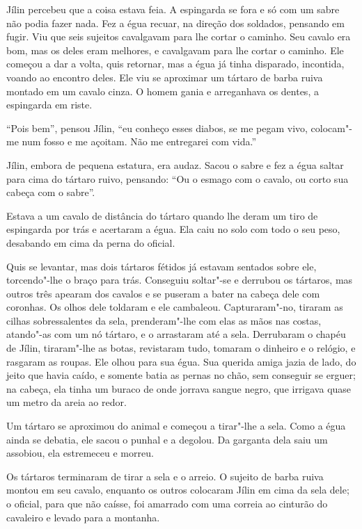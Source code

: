 Jílin percebeu que a coisa estava feia. A espingarda se fora e só com um
sabre não podia fazer nada. Fez a égua recuar, na direção dos soldados,
pensando em fugir. Viu que seis sujeitos cavalgavam para lhe cortar o
caminho. Seu cavalo era bom, mas os deles eram melhores, e cavalgavam
para lhe cortar o caminho. Ele começou a dar a volta, quis retornar, mas
a égua já tinha disparado, incontida, voando ao encontro deles. Ele viu
se aproximar um tártaro de barba ruiva montado em um cavalo cinza. O
homem gania e arreganhava os dentes, a espingarda em riste.

``Pois bem'', pensou Jílin, ``eu conheço esses diabos, se me pegam vivo,
colocam"-me num fosso e me açoitam. Não me entregarei com vida.''

Jílin, embora de pequena estatura, era audaz. Sacou o sabre e fez a égua
saltar para cima do tártaro ruivo, pensando: ``Ou o esmago com o cavalo,
ou corto sua cabeça com o sabre''.

Estava a um cavalo de distância do tártaro quando lhe deram um tiro de
espingarda por trás e acertaram a égua. Ela caiu no solo com todo o seu
peso, desabando em cima da perna do oficial.

Quis se levantar, mas dois tártaros fétidos já estavam sentados sobre
ele, torcendo"-lhe o braço para trás. Conseguiu soltar"-se e derrubou os
tártaros, mas outros três apearam dos cavalos e se puseram a bater na
cabeça dele com coronhas. Os olhos dele toldaram e ele cambaleou.
Capturaram"-no, tiraram as cilhas sobressalentes da sela, prenderam"-lhe
com elas as mãos nas costas, atando"-as com um nó tártaro, e o arrastaram
até a sela. Derrubaram o chapéu de Jílin, tiraram"-lhe as botas,
revistaram tudo, tomaram o dinheiro e o relógio, e rasgaram as roupas.
Ele olhou para sua égua. Sua querida amiga jazia de lado, do jeito que
havia caído, e somente batia as pernas no chão, sem conseguir se erguer;
na cabeça, ela tinha um buraco de onde jorrava sangue negro, que
irrigava quase um metro da areia ao redor.

Um tártaro se aproximou do animal e começou a tirar"-lhe a sela. Como a
égua ainda se debatia, ele sacou o punhal e a degolou. Da garganta dela
saiu um assobiou, ela estremeceu e morreu.

Os tártaros terminaram de tirar a sela e o arreio. O sujeito de barba
ruiva montou em seu cavalo, enquanto os outros colocaram Jílin em cima
da sela dele; o oficial, para que não caísse, foi amarrado com uma
correia ao cinturão do cavaleiro e levado para a montanha.

